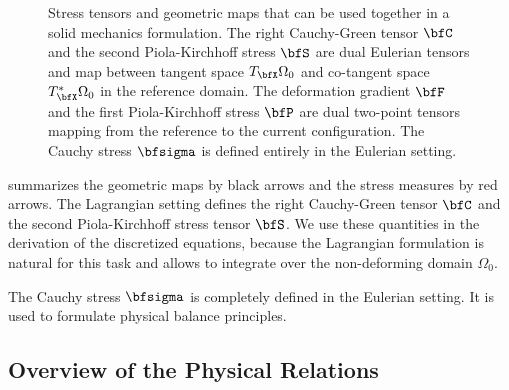 \begin{figure}
  \centering%
  \def\svgwidth{0.5\textwidth}
  \caption{Stress tensors and geometric maps that can be used together in a solid mechanics formulation. The right Cauchy-Green tensor $\bfC$  and the second Piola-Kirchhoff stress $\bfS$ are dual Eulerian tensors and map between tangent space $T_\bfX\Omega_0$ and co-tangent space $T^\ast_\bfX\Omega_0$ in the reference domain. The deformation gradient $\bfF$ and the first Piola-Kirchhoff stress $\bfP$ are dual two-point tensors mapping from the reference to the current configuration. The Cauchy stress $\bfsigma$ is defined entirely in the Eulerian setting.
  }%
  \label{fig:stress_tensors}%
\end{figure}

 summarizes the geometric maps by black arrows and the stress measures by red arrows. 
The Lagrangian setting defines the right Cauchy-Green tensor $\bfC$ and the second Piola-Kirchhoff stress tensor $\bfS$.
We use these quantities in the derivation of the discretized equations, because the Lagrangian formulation is natural for this task and allows to integrate over the non-deforming domain $\Omega_0$.

The Cauchy stress $\bfsigma$ is completely defined in the Eulerian setting. It is used to formulate physical balance principles.

\subsection{Overview of the Physical Relations}

